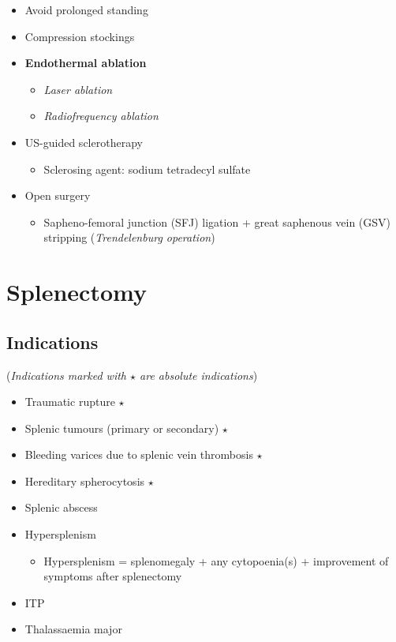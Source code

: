 \documentclass[
  14pt,
]{memoir}
\providecommand{\tightlist}{%
  \setlength{\itemsep}{0pt}\setlength{\parskip}{0pt}}
\begin{document}
\begin{itemize}
\tightlist
\item
  Avoid prolonged standing
\item
  Compression stockings
\item
  \textbf{Endothermal ablation}

  \begin{itemize}
  \tightlist
  \item
    \emph{Laser ablation}
  \item
    \emph{Radiofrequency ablation}
  \end{itemize}
\item
  US-guided sclerotherapy

  \begin{itemize}
  \tightlist
  \item
    Sclerosing agent: sodium tetradecyl sulfate
  \end{itemize}
\item
  Open surgery

  \begin{itemize}
  \tightlist
  \item
    Sapheno-femoral junction (SFJ) ligation + great saphenous vein (GSV)
    stripping (\emph{Trendelenburg operation})
  \end{itemize}
\end{itemize}

\pagebreak

\hypertarget{splenectomy}{%
\chapter{Splenectomy}\label{splenectomy}}

\hypertarget{indications-2}{%
\section{Indications}\label{indications-2}}

(\emph{Indications marked with \(\star\) are absolute indications})

\begin{itemize}
\tightlist
\item
  Traumatic rupture \(\star\)
\item
  Splenic tumours (primary or secondary) \(\star\)
\item
  Bleeding varices due to splenic vein thrombosis \(\star\)
\item
  Hereditary spherocytosis \(\star\)
\item
  Splenic abscess
\item
  Hypersplenism

  \begin{itemize}
  \tightlist
  \item
    Hypersplenism = splenomegaly + any cytopoenia(s) + improvement of
    symptoms after splenectomy
  \end{itemize}
\item
  ITP
\item
  Thalassaemia major
\end{itemize}
\end{document}
